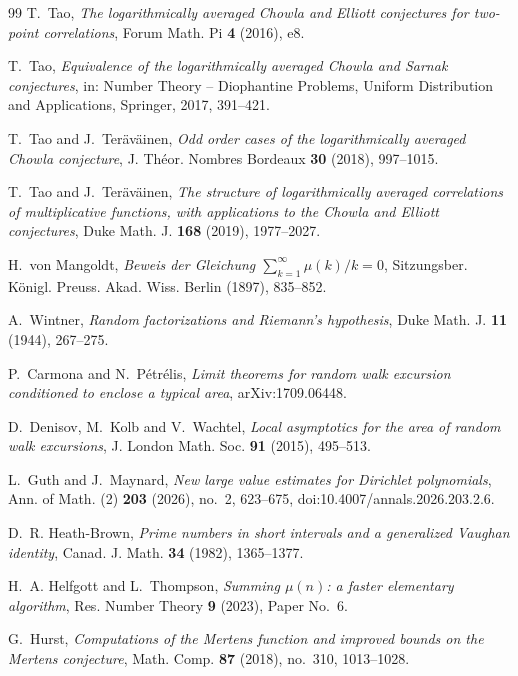\documentclass[11pt]{amsart}
\numberwithin{equation}{section}
\theoremstyle{plain}
\theoremstyle{definition}
\theoremstyle{remark}
\begin{document}
\begin{thebibliography}{99}
T.~Tao, \emph{The logarithmically averaged Chowla and Elliott conjectures for
two-point correlations}, Forum Math. Pi \textbf{4} (2016), e8.

T.~Tao, \emph{Equivalence of the logarithmically averaged Chowla and Sarnak
conjectures}, in: Number Theory -- Diophantine Problems, Uniform
Distribution and Applications, Springer, 2017, 391--421.

T.~Tao and J.~Ter\"av\"ainen, \emph{Odd order cases of the logarithmically
averaged Chowla conjecture}, J. Th\'eor. Nombres Bordeaux \textbf{30} (2018),
997--1015.

T.~Tao and J.~Ter\"av\"ainen, \emph{The structure of logarithmically averaged
correlations of multiplicative functions, with applications to the Chowla
and Elliott conjectures}, Duke Math. J. \textbf{168} (2019), 1977--2027.

H.~von Mangoldt, \emph{Beweis der Gleichung $\sum_{k=1}^\infty\mu(k)/k=0$},
Sitzungsber. K\"onigl. Preuss. Akad. Wiss. Berlin (1897), 835--852.

A.~Wintner, \emph{Random factorizations and Riemann's hypothesis}, Duke
Math. J. \textbf{11} (1944), 267--275.


P.~Carmona and N.~P\'etr\'elis, \emph{Limit theorems for random walk excursion
conditioned to enclose a typical area}, arXiv:1709.06448.

D.~Denisov, M.~Kolb and V.~Wachtel, \emph{Local asymptotics for the area of
random walk excursions}, J. London Math. Soc. \textbf{91} (2015), 495--513.

L.~Guth and J.~Maynard, \emph{New large value estimates for Dirichlet
polynomials}, Ann. of Math. (2) \textbf{203} (2026), no.~2, 623--675,
doi:10.4007/annals.2026.203.2.6.

D.~R. Heath-Brown, \emph{Prime numbers in short intervals and a generalized
Vaughan identity}, Canad. J. Math. \textbf{34} (1982), 1365--1377.

H.~A. Helfgott and L.~Thompson, \emph{Summing $\mu(n)$: a faster elementary
algorithm}, Res. Number Theory \textbf{9} (2023), Paper No.~6.

G.~Hurst, \emph{Computations of the Mertens function and improved bounds on
the Mertens conjecture}, Math. Comp. \textbf{87} (2018), no.~310, 1013--1028.


\end{thebibliography}
\end{document}

